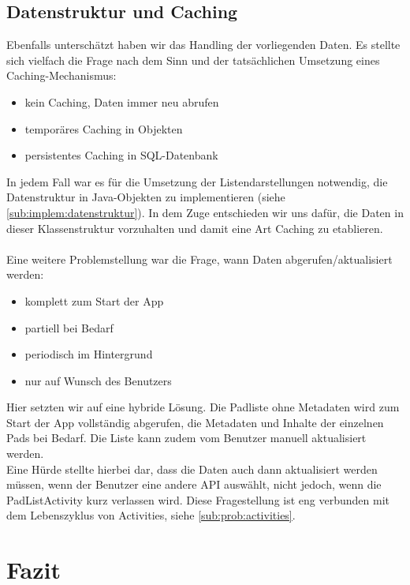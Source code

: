 \subsection{Datenstruktur und Caching}
Ebenfalls unterschätzt haben wir das Handling der vorliegenden Daten.
Es stellte sich vielfach die Frage nach dem Sinn und der tatsächlichen Umsetzung eines Caching-Mechanismus:
\begin{itemize}
	\item kein Caching, Daten immer neu abrufen
	\item temporäres Caching in Objekten
	\item persistentes Caching in SQL-Datenbank
\end{itemize}

In jedem Fall war es für die Umsetzung der Listendarstellungen notwendig, die Datenstruktur in Java-Objekten zu implementieren (siehe \autoref{sub:implem:datenstruktur}).
In dem Zuge entschieden wir uns dafür, die Daten in dieser Klassenstruktur vorzuhalten und damit eine Art Caching zu etablieren.\\
\\
Eine weitere Problemstellung war die Frage, wann Daten abgerufen/aktualisiert werden:
\begin{itemize}
	\item komplett zum Start der App
	\item partiell bei Bedarf
	\item periodisch im Hintergrund
	\item nur auf Wunsch des Benutzers
\end{itemize}

Hier setzten wir auf eine hybride Lösung.
Die Padliste ohne Metadaten wird zum Start der App vollständig abgerufen, die Metadaten und Inhalte der einzelnen Pads bei Bedarf.
Die Liste kann zudem vom Benutzer manuell aktualisiert werden.\\
Eine Hürde stellte hierbei dar, dass die Daten auch dann aktualisiert werden müssen, wenn der Benutzer eine andere API auswählt, nicht jedoch, wenn die PadListActivity kurz verlassen wird.
Diese Fragestellung ist eng verbunden mit dem Lebenszyklus von Activities, siehe \autoref{sub:prob:activities}.


\section{Fazit}




